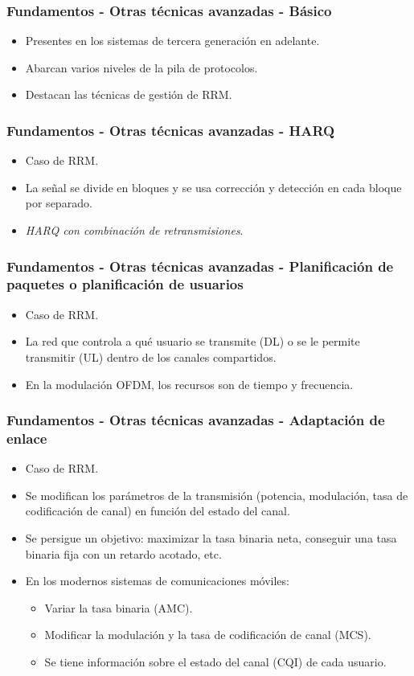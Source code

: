 \documentclass{beamer}
\begin{document}
\begin{frame}
\frametitle{Fundamentos - Otras técnicas avanzadas - Básico}

\begin{itemize}
\item Presentes en los sistemas de tercera generación en adelante.
\item Abarcan varios niveles de la pila de protocolos.
\item Destacan las técnicas de gestión de RRM.
\end{itemize}
\end{frame}

\begin{frame}
\frametitle{Fundamentos - Otras técnicas avanzadas - HARQ}

\begin{itemize}
\item Caso de RRM.
\item La señal se divide en bloques y se usa corrección y detección en cada bloque por separado.
\item \textit{HARQ con combinación de retransmisiones}.
\end{itemize}
\end{frame}

\begin{frame}
\frametitle{Fundamentos - Otras técnicas avanzadas - Planificación de paquetes o planificación de usuarios}

\begin{itemize}
\item Caso de RRM.
\item La red que controla a qué usuario se transmite (DL) o se le permite transmitir (UL) dentro de los canales compartidos.
\item En la modulación OFDM, los recursos son de tiempo y frecuencia.
\end{itemize}
\end{frame}

\begin{frame}
\frametitle{Fundamentos - Otras técnicas avanzadas - Adaptación de enlace}

\begin{itemize}
\item Caso de RRM.
\item Se modifican los parámetros de la transmisión (potencia, modulación, tasa de codificación de canal) en función del estado del canal.
\item Se persigue un objetivo: maximizar la tasa binaria neta, conseguir una tasa binaria fija con un retardo acotado, etc.
\item {
	En los modernos sistemas de comunicaciones móviles:
	\begin{itemize}
	\item Variar la tasa binaria (AMC).
	\item Modificar la modulación y la tasa de codificación de canal (MCS).
	\item Se tiene información sobre el estado del canal (CQI) de cada usuario.
	\end{itemize}
}
\end{itemize}
\end{frame}
\end{document}

